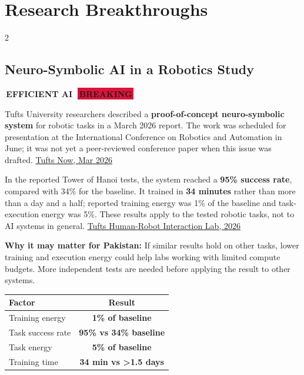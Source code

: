 \documentclass[10pt, a4paper]{article}
\newcommand{\sectiontag}[1]{%
  \noindent\colorbox{cobalt}{%
    \,\footnotesize\bfseries\color{white}\MakeUppercase{#1}\,}\,%
}
\newcommand{\hottag}{%
  \colorbox{crimson}{\,\scriptsize\bfseries\color{white}BREAKING\,}\ %
}
\begin{document}
\section{Research Breakthroughs}

\begin{multicols}{2}

\subsection{Neuro-Symbolic AI in a Robotics Study}

\sectiontag{Efficient AI}\quad\hottag

\medskip
{\small
Tufts University researchers described a \textbf{proof-of-concept neuro-symbolic system} for robotic tasks in a March 2026 report. The work was scheduled for presentation at the International Conference on Robotics and Automation in June; it was not yet a peer-reviewed conference paper when this issue was drafted.
\href{https://now.tufts.edu/2026/03/17/new-ai-models-could-slash-energy-use-while-dramatically-improving-performance}{Tufts Now, Mar 2026}

In the reported Tower of Hanoi tests, the system reached a \textbf{95\% success rate}, compared with 34\% for the baseline. It trained in \textbf{34 minutes} rather than more than a day and a half; reported training energy was 1\% of the baseline and task-execution energy was 5\%. These results apply to the tested robotic tasks, not to AI systems in general.
\href{https://hrilab.tufts.edu/publications/dugganetal26icra/}{Tufts Human-Robot Interaction Lab, 2026}

\textbf{Why it may matter for Pakistan:} If similar results hold on other tasks, lower training and execution energy could help labs working with limited compute budgets. More independent tests are needed before applying the result to other systems.
}

\begin{alertbox}[title={\faHeartbeat\quad Breakthrough Metrics}]
  \begin{center}
  \begin{tabular}{l c}
    \toprule
    \small\textbf{Factor} & \small\textbf{Result} \\
    \midrule
    \small Training energy   & \small \textbf{1\% of baseline} \\
    \small Task success rate & \small \textbf{95\% vs 34\% baseline} \\
    \small Task energy       & \small \textbf{5\% of baseline} \\
    \small Training time     & \small \textbf{34 min vs >1.5 days} \\
    \bottomrule
  \end{tabular}
  \end{center}
\end{alertbox}


\end{multicols}
\end{document}
